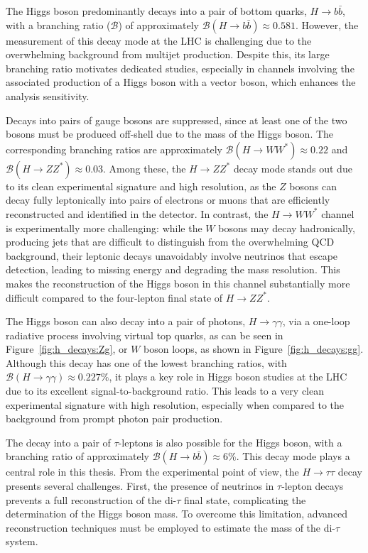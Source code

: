 The Higgs boson predominantly decays into a pair of bottom quarks, \( H \rightarrow b\bar{b} \), with a branching ratio ($\mathcal{B}$) of approximately \( \mathcal{B}(H \rightarrow b\bar{b}) \approx 0.581 \). However, the measurement of this decay mode at the LHC is challenging due to the overwhelming background from multijet production. Despite this, its large branching ratio motivates dedicated studies, especially in channels involving the associated production of a Higgs boson with a vector boson, which enhances the analysis sensitivity.

Decays into pairs of gauge bosons are suppressed, since at least one of the two bosons must be produced off-shell due to the mass of the Higgs boson. The corresponding branching ratios are approximately \( \mathcal{B}(H \rightarrow WW^*) \approx 0.22 \) and \( \mathcal{B}(H \rightarrow ZZ^*) \approx 0.03 \). Among these, the \( H \rightarrow ZZ^* \) decay mode stands out due to its clean experimental signature and high resolution, as the $Z$ bosons can decay fully leptonically into pairs of electrons or muons that are efficiently reconstructed and identified in the detector. 
In contrast, the \( H \rightarrow WW^* \) channel is experimentally more challenging: while the $W$ bosons may decay hadronically, producing jets that are difficult to distinguish from the overwhelming QCD background, their leptonic decays unavoidably involve neutrinos that escape detection, leading to missing energy and degrading the mass resolution. This makes the reconstruction of the Higgs boson in this channel substantially more difficult compared to the four-lepton final state of \( H \rightarrow ZZ^* \).

The Higgs boson can also decay into a pair of photons, \( H \rightarrow \gamma\gamma \), via a one-loop radiative process involving virtual top quarks, as can be seen in Figure~\ref{fig:h_decays:Zg}, or $W$ boson loops, as shown in Figure~\ref{fig:h_decays:gg}. Although this decay has one of the lowest branching ratios, with \( \mathcal{B}(H \rightarrow \gamma\gamma) \approx 0.227\% \), it plays a key role in Higgs boson studies at the LHC due to its excellent signal-to-background ratio. This leads to a very clean experimental signature with high resolution, especially when compared to the background from prompt photon pair production.

The decay into a pair of $\tau$-leptons is also possible for the Higgs boson, with a branching ratio of approximately \( \mathcal{B}(H \rightarrow b\bar{b}) \approx 6\% \). This decay mode plays a central role in this thesis. From the experimental point of view, the $H \rightarrow \tau\tau$ decay presents several challenges. First, the presence of neutrinos in $\tau$-lepton decays prevents a full reconstruction of the di-$\tau$ final state, complicating the determination of the Higgs boson mass. To overcome this limitation, advanced reconstruction techniques must be employed to estimate the mass of the di-$\tau$ system.

